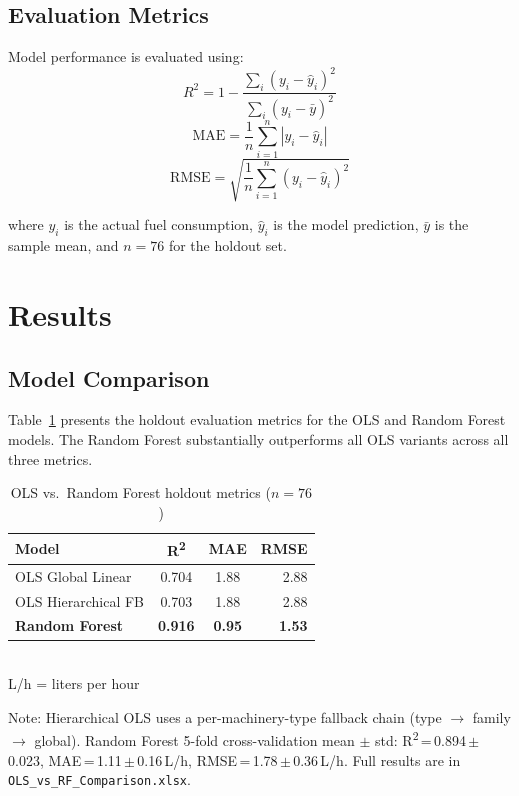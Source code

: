 \documentclass[conference]{IEEEtran}
\begin{document}
\subsection{Evaluation Metrics}

Model performance is evaluated using:
\[
R^2 = 1 - \frac{\sum_i (y_i - \hat{y}_i)^2}{\sum_i (y_i - \bar{y})^2}
\]
\[
\mathrm{MAE} = \frac{1}{n}\sum_{i=1}^{n} |y_i - \hat{y}_i|
\]
\[
\mathrm{RMSE} = \sqrt{\frac{1}{n}\sum_{i=1}^{n}(y_i - \hat{y}_i)^2}
\]

where $y_i$ is the actual fuel consumption, $\hat{y}_i$ is the model prediction, $\bar{y}$ is the sample mean, and $n = 76$ for the holdout set.

\section{Results}

\subsection{Model Comparison}

Table~\ref{tab:metrics} presents the holdout evaluation metrics for the OLS and Random Forest models. The Random Forest substantially outperforms all OLS variants across all three metrics.

\begin{table}[H]
\centering

\caption{OLS vs.\ Random Forest holdout metrics ($n = 76$)}
\label{tab:metrics}
\footnotesize
\begin{tabular}{lccr}
\toprule
\textbf{Model} & \textbf{R\textsuperscript{2}} & \textbf{MAE} & \textbf{RMSE} \\
\midrule
OLS Global Linear & 0.704 & 1.88 & 2.88 \\
OLS Hierarchical FB & 0.703 & 1.88 & 2.88 \\
\textbf{Random Forest} & \textbf{0.916} & \textbf{0.95} & \textbf{1.53} \\
\bottomrule
\end{tabular}\\
{\tiny L/h = liters per hour}
\end{table}

\vspace{2pt}
{\footnotesize Note: Hierarchical OLS uses a per-machinery-type fallback chain (type $\to$ family $\to$ global). Random Forest 5-fold cross-validation mean $\pm$ std: R\textsuperscript{2}\,=\,0.894\,$\pm$\,0.023, MAE\,=\,1.11\,$\pm$\,0.16\,L/h, RMSE\,=\,1.78\,$\pm$\,0.36\,L/h. Full results are in \texttt{OLS\_vs\_RF\_Comparison.xlsx}.}
\end{document}
